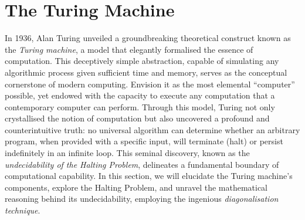 \section{The Turing Machine}\label{sec:turing-machine}

In 1936, Alan Turing unveiled a groundbreaking theoretical construct known as the \textit{Turing machine}, a model that elegantly formalised the essence of computation. This deceptively simple abstraction, capable of simulating any algorithmic process given sufficient time and memory, serves as the conceptual cornerstone of modern computing. Envision it as the most elemental ``computer'' possible, yet endowed with the capacity to execute any computation that a contemporary computer can perform. Through this model, Turing not only crystallised the notion of computation but also uncovered a profound and counterintuitive truth: no universal algorithm can determine whether an arbitrary program, when provided with a specific input, will terminate (halt) or persist indefinitely in an infinite loop. This seminal discovery, known as the \textit{undecidability of the Halting Problem}, delineates a fundamental boundary of computational capability. In this section, we will elucidate the Turing machine's components, explore the Halting Problem, and unravel the mathematical reasoning behind its undecidability, employing the ingenious \textit{diagonalisation technique}.


